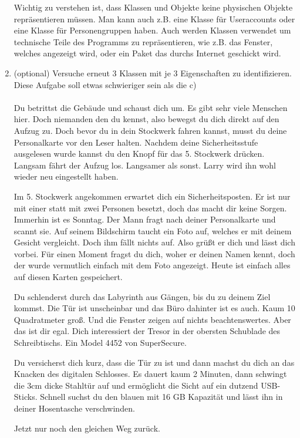 \begin{enumerate}
    \begin{Infobox}
        Wichtig zu verstehen ist, dass Klassen und Objekte keine physischen Objekte repräsentieren müssen. Man kann auch z.B. eine Klasse für Useraccounts oder eine Klasse für Personengruppen haben. Auch werden Klassen verwendet um technische Teile des Programms zu repräsentieren, wie z.B. das Fenster, welches angezeigt wird, oder ein Paket das durchs Internet geschickt wird.
    \end{Infobox}

    \item (optional) Versuche erneut 3 Klassen mit je 3 Eigenschaften  zu identifizieren. Diese Aufgabe soll etwas schwieriger sein als die c)
    \paragraph{}
    Du betrittst die Gebäude und schaust dich um. Es gibt sehr viele Menschen hier. Doch niemanden den du kennst, also bewegst du dich direkt auf den Aufzug zu. Doch bevor du in dein Stockwerk fahren kannst, musst du deine Personalkarte vor den Leser halten. Nachdem deine Sicherheitsstufe ausgelesen wurde kannst du den Knopf für das 5. Stockwerk drücken. Langsam fährt der Aufzug los. Langsamer als sonst. Larry wird ihn wohl wieder neu eingestellt haben.

    Im 5. Stockwerk angekommen erwartet dich ein Sicherheitsposten. Er ist nur mit einer statt mit zwei Personen besetzt, doch das macht dir keine Sorgen. Immerhin ist es Sonntag. Der Mann fragt nach deiner Personalkarte und scannt sie. Auf seinem Bildschirm taucht ein Foto auf, welches er mit deinem Gesicht vergleicht. Doch ihm fällt nichts auf. Also grüßt er dich und lässt dich vorbei. Für einen Moment fragst du dich, woher er deinen Namen kennt, doch der wurde vermutlich einfach mit dem Foto angezeigt. Heute ist einfach alles auf diesen Karten gespeichert.

    Du schlenderst durch das Labyrinth aus Gängen, bis du zu deinem Ziel kommst. Die Tür ist unscheinbar und das Büro dahinter ist es auch. Kaum 10 Quadratmeter groß. Und die Fenster zeigen auf nichts beachtenswertes. Aber das ist dir egal. Dich interessiert der Tresor in der obersten Schublade des Schreibtischs. Ein Model 4452 von SuperSecure.

    Du versicherst dich kurz, dass die Tür zu ist und dann machst du dich an das Knacken des digitalen Schlosses. Es dauert kaum 2 Minuten, dann schwingt die 3cm dicke Stahltür auf und ermöglicht die Sicht auf ein dutzend USB-Sticks. Schnell suchst du den blauen mit 16 GB Kapazität und lässt ihn in deiner Hosentasche verschwinden.

    Jetzt nur noch den gleichen Weg zurück.
\end{enumerate}
